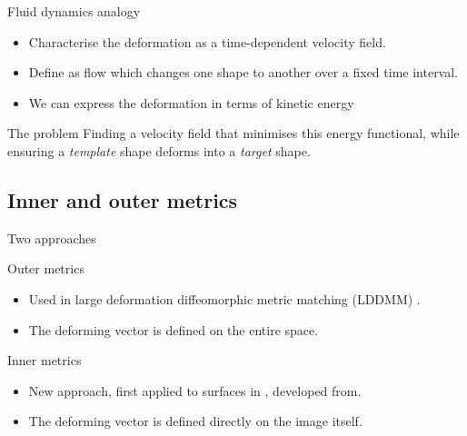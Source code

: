 \documentclass{beamer}
\begin{document}
\begin{frame}{Fluid dynamics analogy}
  \begin{itemize}
  \item Characterise the  deformation as a time-dependent velocity field.
  \item Define as flow which changes one shape to another over a fixed time interval. 
  \item We can express the deformation in terms of kinetic energy
  \end{itemize}

  \pause

  \begin{block}{The problem}
    Finding a velocity field that minimises this energy functional, while ensuring a \textit{template} shape deforms into a \textit{target} shape.
  \end{block}
\end{frame}

\subsection{Inner and outer metrics}
\begin{frame}{Two approaches}

\begin{block}{Outer metrics}
  \begin{itemize}
  \item Used in large deformation diffeomorphic metric matching (LDDMM)
    \cite{grenander1993general,
      beg2005computing,bruveris2011momentum,glaunes2008large}.
  \item   The deforming vector is defined on the entire space.
  \end{itemize}
\end{block}

\begin{exampleblock}{Inner metrics}

\begin{itemize}
\item New approach, first applied to surfaces in \cite{bauer2011new}, developed
  from\cite{michor2005vanishing,michor2003riemannian,younes2008metric}.
\item The deforming vector is defined directly on the image itself.
\end{itemize}

\end{exampleblock}

\end{frame}
\end{document}

